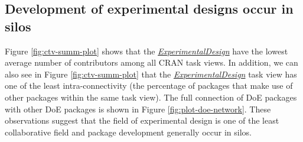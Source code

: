 \documentclass{article}
\begin{document}
\hypertarget{silo}{%
\subsection{Development of experimental designs occur in
silos}\label{silo}}

Figure \ref{fig:ctv-summ-plot} shows that the
\href{http://CRAN.R-project.org/view=ExperimentalDesign}{\emph{ExperimentalDesign}}
have the lowest average number of contributors among all CRAN task
views. In addition, we can also see in Figure \ref{fig:ctv-summ-plot}
that the
\href{http://CRAN.R-project.org/view=ExperimentalDesign}{\emph{ExperimentalDesign}}
task view has one of the least intra-connectivity (the percentage of
packages that make use of other packages within the same task view). The
full connection of DoE packages with other DoE packages is shown in
Figure \ref{fig:plot-doe-network}. These observations suggest that the
field of experimental design is one of the least collaborative field and
package development generally occur in silos.
\end{document}

